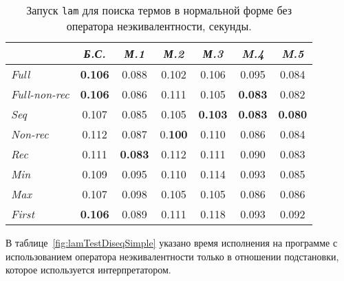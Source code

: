 \begin{table}[h!]
\center
\begin{tabular}{|l|c|c|c|c|c|c|}
\hline
   &{\it Б.С.}&{\it М.1}&{\it М.2}&{\it М.3}&{\it M.4}&{\it M.5} \\ \hline

{\it Full        } & {\bf 0.106}& 0.088     & 0.102       & 0.106       & 0.095       & 0.084 \\ \hline
{\it Full-non-rec} & {\bf 0.106}& 0.086     & 0.111       & 0.105       & {\bf 0.083} & 0.082 \\ \hline
{\it Seq         } & 0.107      & 0.085     & 0.105       & {\bf 0.103} & {\bf 0.083} & {\bf 0.080} \\ \hline
{\it Non-rec     } & 0.112      & 0.087     & 0.{\bf 100} & 0.110       & 0.086       & 0.084 \\ \hline
{\it Rec         } & 0.111      &{\bf 0.083}& 0.112       & 0.111       & 0.090       & 0.083 \\ \hline
{\it Min         } & 0.109      & 0.095     & 0.110       & 0.114       & 0.093       & 0.085 \\ \hline
{\it Max         } & 0.107      & 0.098     & 0.105       & 0.105       & 0.086       & 0.086 \\ \hline
{\it First       } & {\bf 0.106}& 0.089     & 0.111       & 0.118       & 0.093       & 0.092 \\ \hline
\end{tabular}
\caption{Запуск \lstinline{lam} для поиска термов в нормальной форме без оператора неэкивалентности, секунды.}
\label{fig:lamTestSimple}
\end{table}

В таблице~\ref{fig:lamTestDiseqSimple} указано время исполнения на программе с
использованием оператора неэкивалентности только в отношении подстановки, которое
используется интерпретатором.

